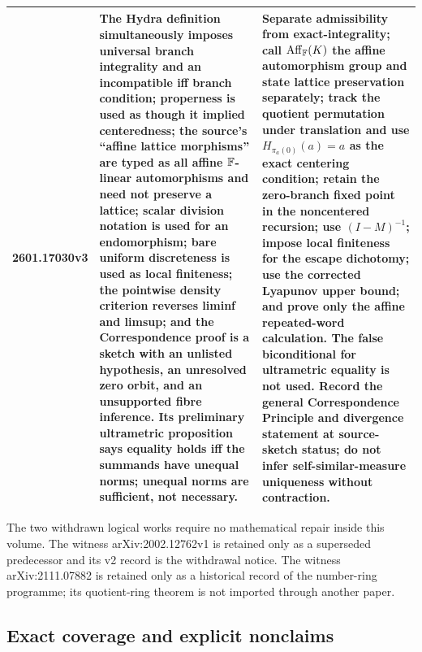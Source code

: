\begin{longtable}{@{}p{}p{}p{}@{}}
2601.17030v3 & The Hydra definition simultaneously imposes universal branch
integrality and an incompatible iff branch condition; properness is used as
though it implied centeredness; the source's ``affine lattice morphisms'' are
typed as all affine $\mathbb F$-linear automorphisms and need not preserve a lattice;
scalar division notation is used for an endomorphism; bare uniform
discreteness is used as local finiteness; the
pointwise density criterion reverses liminf and limsup; and the
Correspondence proof is a sketch with an unlisted hypothesis, an unresolved
zero orbit, and an unsupported fibre inference.  Its preliminary
ultrametric proposition says equality holds iff the summands have unequal
norms; unequal norms are sufficient, not necessary. & Separate admissibility
from exact-integrality; call $\operatorname{Aff}_\mathbb F(K)$ the affine automorphism group and
state lattice preservation separately; track the quotient permutation under
translation and use $H_{\pi_a(0)}(a)=a$ as the exact centering condition;
retain the zero-branch fixed point in the noncentered recursion; use
$(I-M)^{-1}$; impose local finiteness for the escape dichotomy; use the
corrected Lyapunov upper bound; and prove only the affine repeated-word
calculation.  The false biconditional for ultrametric equality is not used.
Record the general Correspondence Principle and divergence statement at
source-sketch status; do not infer self-similar-measure uniqueness without
contraction.\\
\bottomrule
\end{longtable}
\endgroup

The two withdrawn logical works require no mathematical repair inside this
volume.  The witness arXiv:2002.12762v1 is retained only as a superseded
predecessor and its v2 record is the withdrawal notice.  The witness
arXiv:2111.07882 is retained only as
a historical record of the number-ring programme; its quotient-ring theorem
is not imported through another paper.

\subsection{Exact coverage and explicit nonclaims}

